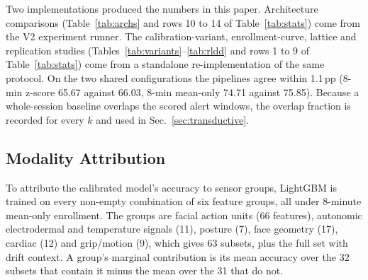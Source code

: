 \documentclass[journal]{IEEEtran}
\newcommand{\pp}{\,pp}
\begin{document}
Two implementations produced the numbers in this paper. Architecture
comparisons (Table~\ref{tab:archs} and rows 10 to 14 of Table~\ref{tab:stats})
come from the V2 experiment runner. The calibration-variant, enrollment-curve,
lattice and replication studies (Tables~\ref{tab:variants}--\ref{tab:rldd}
and rows 1 to 9 of Table~\ref{tab:stats}) come from a standalone
re-implementation of the same protocol. On the two shared configurations the
pipelines agree within 1.1\pp{} (8-min z-score 65.67 against 66.03, 8-min
mean-only 74.71 against 75.85). Because a whole-session baseline overlaps the
scored alert windows, the overlap fraction is recorded for every $k$ and used
in Sec.~\ref{sec:transductive}.

\subsection{Modality Attribution}
\label{sec:lattice}
To attribute the calibrated model's accuracy to sensor groups, LightGBM is
trained on every non-empty combination of six feature groups, all under
8-minute mean-only enrollment. The groups are facial action units (66
features), autonomic electrodermal and temperature signals (11), posture (7),
face geometry (17), cardiac (12) and grip/motion (9), which gives 63 subsets,
plus the full set with drift context. A group's marginal contribution is its
mean accuracy over the 32 subsets that contain it minus the mean over the 31
that do not.
\end{document}
